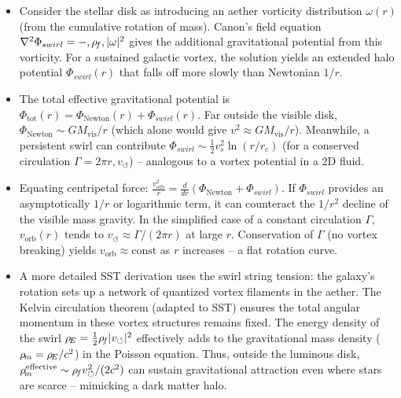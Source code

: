 \documentclass[11pt]{article}
\begin{document}
\begin{itemize}

\item 
Consider the stellar disk as introducing an aether vorticity distribution $\omega(r)$ (from the cumulative rotation of mass). Canon’s field equation $\nabla^2 \Phi_{swirl} = -,\rho_{\!f},|\omega|^2$ gives the additional gravitational potential from this vorticity. For a sustained galactic vortex, the solution yields an extended halo potential $\Phi_{swirl}(r)$ that falls off more slowly than Newtonian $1/r$.




\item 
The total effective gravitational potential is $ \Phi_{\text{tot}}(r) = \Phi_{\text{Newton}}(r) + \Phi_{swirl}(r)$. Far outside the visible disk, $\Phi_{\text{Newton}} \sim GM_{\text{vis}}/r$ (which alone would give $v^2 \approx GM_{\text{vis}}/r$). Meanwhile, a persistent swirl can contribute $\Phi_{swirl} \sim \frac{1}{2}v_s^2 \ln(r/r_c)$ (for a conserved circulation $\Gamma = 2\pi r,v_{\circlearrowleft}$) – analogous to a vortex potential in a 2D fluid.




\item 
Equating centripetal force: $ \frac{v_{\text{orb}}^2}{r} = \frac{d}{dr}(\Phi_{\text{Newton}} + \Phi_{swirl})$. If $\Phi_{swirl}$ provides an asymptotically $1/r$ or logarithmic term, it can counteract the $1/r^2$ decline of the visible mass gravity. In the simplified case of a constant circulation $\Gamma$, $v_{\text{orb}}(r)$ tends to $v_{\circlearrowleft} \approx \Gamma/(2\pi r)$ at large $r$. Conservation of $\Gamma$ (no vortex breaking) yields $v_{\text{orb}} \approx \text{const}$ as $r$ increases – a flat rotation curve.




\item 
A more detailed SST derivation uses the swirl string tension: the galaxy’s rotation sets up a network of quantized vortex filaments in the aether. The Kelvin circulation theorem (adapted to SST) ensures the total angular momentum in these vortex structures remains fixed. The energy density of the swirl $\rho_{\!E} = \frac{1}{2}\rho_{\!f} |v_{\circlearrowleft}|^2$ effectively adds to the gravitational mass density ($\rho_{\!m} = \rho_{\!E}/c^2$) in the Poisson equation. Thus, outside the luminous disk, $\rho_{\!m}^{\text{effective}} \sim \rho_{\!f} v_{\circlearrowleft}^2/(2c^2)$ can sustain gravitational attraction even where stars are scarce – mimicking a dark matter halo.





\end{itemize}
\end{document}
